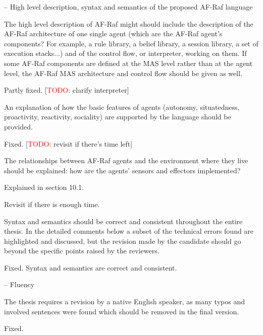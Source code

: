 \documentclass{article}
\newcommand{\todo}[1]{[\textcolor{red}{TODO}: #1]}
\newenvironment{them}{\noindent\begingroup\color{blue}}{\endgroup\par}
\begin{document}
\begin{them}

-- High level description, syntax and semantics of the proposed AF-Raf language

The high level description of AF-Raf might should include the description of
the AF-Raf architecture of one single agent (which are the AF-Raf agent's
components? For example, a rule library, a belief library, a session library, a
set of execution stacks...) and of the control flow, or interpreter, working on
them. If some AF-Raf components are defined at the MAS level rather than at the
agent level, the AF-Raf MAS architecture and control flow should be given as
well.

\end{them}
Partly fixed.
\todo{clarify interpreter}

\begin{them}

An explanation of how the basic features of agents (autonomy, situatedness,
proactivity, reactivity, sociality) are supported by the language should be
provided. 

\end{them}
Fixed.
\todo{revisit if there's time left}

\begin{them}

The relationships between AF-Raf agents and the environment where
they live should be explained: how are the agents' sensors and effectors
implemented? 

\end{them}
Explained in section 10.1.

Revisit if there is enough time.

\begin{them}

Syntax and semantics should be correct and consistent throughout the entire
thesis. In the detailed comments below a subset of the technical errors found
are highlighted and discussed, but the revision made by the candidate should go
beyond the specific points raised by the reviewers.

\end{them}
Fixed. Syntax and semantics are correct and consistent.

\begin{them}

-- Fluency

The thesis requires a revision by a native English speaker, as many typos and
involved sentences were found which should be removed in the final version.

\end{them}
Fixed.
\end{document}
